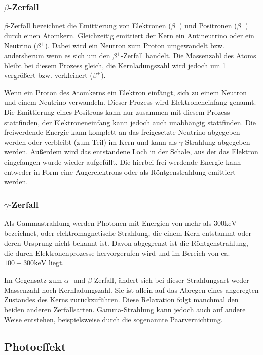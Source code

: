\documentclass[
	parskip=half,10pt,
	numbers= noenddot, %
	toc=flat, %
	oneside,
	twocolumn,
	]{scrartcl}
\begin{document}
\subsubsection{$\beta$-Zerfall}
$\beta$-Zerfall bezeichnet die Emittierung von Elektronen ($\beta^-$) und Positronen ($\beta^+$) durch einen Atomkern. Gleichzeitig emittiert der Kern ein 
Antineutrino oder ein Neutrino ($\beta^+$). Dabei wird ein Neutron zum Proton umgewandelt bzw. andersherum wenn es sich um den $\beta^+$-Zerfall handelt. Die 
Massenzahl des Atoms bleibt bei diesem Prozess gleich, die Kernladungszahl wird jedoch um 1 vergrößert bzw. verkleinert ($\beta^+$). 

Wenn ein Proton des Atomkerns ein Elektron einfängt, sich zu einem Neutron und einem Neutrino verwandeln. Dieser Prozess wird Elektroneneinfang genannt.
Die Emittierung eines Positrons kann nur zusammen mit diesem Prozess stattfinden, der Elektroneneinfang kann jedoch auch unabhängig stattfinden. Die 
freiwerdende Energie kann komplett an das freigesetzte Neutrino abgegeben werden oder verbleibt (zum Teil) im Kern und kann als $\gamma$-Strahlung abgegeben werden. 
Außerdem wird das entstandene Loch in der Schale, aus der das Elektron eingefangen wurde wieder aufgefüllt. Die hierbei frei werdende Energie kann entweder 
in Form eine Augerelektrons oder als Röntgenstrahlung emittiert werden. 

\subsubsection{$\gamma$-Zerfall}

Als Gammastrahlung werden Photonen mit Energien von mehr als $300 \si{\kilo \electronvolt}$ bezeichnet, oder elektromagnetische Strahlung, die einem Kern 
entstammt oder deren Ursprung nicht bekannt ist. Davon abgegrenzt ist die Röntgenstrahlung, die durch Elektronenprozesse hervorgerufen wird und im Bereich von 
ca. $100-300 \si{\kilo \electronvolt}$ liegt. 

Im Gegensatz zum $\alpha$- und $\beta$-Zerfall, ändert sich bei dieser Strahlungsart weder Massenzahl noch Kernladungszahl. Sie ist allein auf das Abregen eines 
angeregten Zustandes des Kerns zurückzuführen. Diese Relaxation folgt manchmal den beiden anderen Zerfallsarten. Gamma-Strahlung kann jedoch auch auf andere 
Weise entstehen, beispielsweise durch die sogenannte Paarvernichtung. 

\subsection{Photoeffekt}
\end{document}
